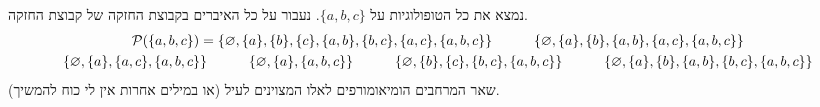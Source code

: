 \documentclass[]{../../../../../tex/classes/homework}
\begin{document}
	\section{}
	נמצא את כל הטופולוגיות על $\{a, b, c\}$. נעבור על כל האיברים בקבוצת החזקה של קבוצת החזקה. 
	\begin{gather*}
		\mathcal{P}(\{a, b, c\}) = \{\varnothing, \{a\}, \{b\}, \{c\}, \{a, b\}, \{b, c\}, \{a, c\}, \{a, b, c\}\} \quad\quad\quad \{\varnothing, \{a\}, \{b\}, \{a, b\}, \{a, c\}, \{a, b, c\}\} \\
		\{\varnothing, \{a\}, \{a, c\}, \{a, b, c\}\} \quad\quad\quad \{\varnothing, \{a\}, \{a, b, c\}\}  \quad\quad\quad \{\varnothing, \{b\}, \{c\}, \{b, c\}, \{a, b, c\}\} \quad\quad\quad \{\varnothing, \{a\}, \{b\}, \{a, b\}, \{b, c\}, \{a, b, c\}\} \\
	\end{gather*}
	שאר המרחבים הומיאומורפים לאלו המצוינים לעיל (או במילים אחרות אין לי כוח להמשיך). 
	
\end{document}

